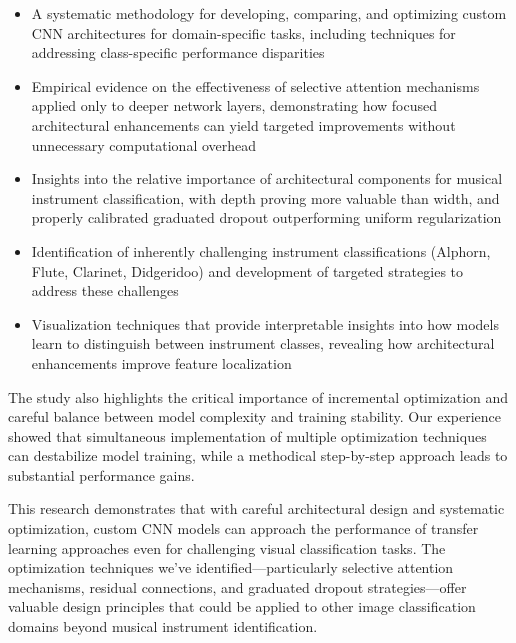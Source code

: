 \begin{itemize}
    \item A systematic methodology for developing, comparing, and optimizing custom CNN architectures for domain-specific tasks, including techniques for addressing class-specific performance disparities
    
    \item Empirical evidence on the effectiveness of selective attention mechanisms applied only to deeper network layers, demonstrating how focused architectural enhancements can yield targeted improvements without unnecessary computational overhead
    
    \item Insights into the relative importance of architectural components for musical instrument classification, with depth proving more valuable than width, and properly calibrated graduated dropout outperforming uniform regularization
    
    \item Identification of inherently challenging instrument classifications (Alphorn, Flute, Clarinet, Didgeridoo) and development of targeted strategies to address these challenges
    
    \item Visualization techniques that provide interpretable insights into how models learn to distinguish between instrument classes, revealing how architectural enhancements improve feature localization
\end{itemize}

The study also highlights the critical importance of incremental optimization and careful balance between model complexity and training stability. Our experience showed that simultaneous implementation of multiple optimization techniques can destabilize model training, while a methodical step-by-step approach leads to substantial performance gains.

This research demonstrates that with careful architectural design and systematic optimization, custom CNN models can approach the performance of transfer learning approaches even for challenging visual classification tasks. The optimization techniques we've identified—particularly selective attention mechanisms, residual connections, and graduated dropout strategies—offer valuable design principles that could be applied to other image classification domains beyond musical instrument identification.
